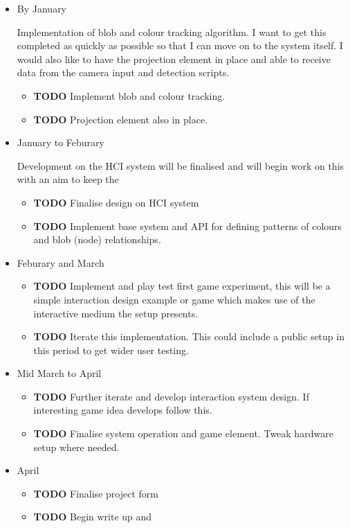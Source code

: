 \documentclass[11pt]{article}
\begin{document}
\begin{itemize}
\item By January
\label{sec:orgc368095}

Implementation of blob and colour tracking algorithm. I want to get this completed as quickly as possible so that I can move on to the system itself. I would also like to have the projection element in place and able to receive data from the camera input and detection scripts.\\
\begin{itemize}
\item {\bfseries\sffamily TODO} Implement blob and colour tracking.
\label{sec:orga0b261e}
\item {\bfseries\sffamily TODO} Projection element also in place.
\label{sec:org0037926}
\end{itemize}
\item January to Feburary
\label{sec:orge041dfd}

Development on the HCI system will be finalised and will begin work on this with an aim to keep the\\
\begin{itemize}
\item {\bfseries\sffamily TODO} Finalise design on HCI system
\label{sec:org12a0f30}
\item {\bfseries\sffamily TODO} Implement base system and API for defining patterns of colours and blob (node) relationships.
\label{sec:org5c20517}
\end{itemize}
\item Feburary and March
\label{sec:orgf25e615}
\begin{itemize}
\item {\bfseries\sffamily TODO} Implement and play test first game experiment, this will be a simple interaction design example or game which makes use of the interactive medium the setup presents.
\label{sec:org3f88d1a}
\item {\bfseries\sffamily TODO} Iterate this implementation. This could include a public setup in this period to get wider user testing.
\label{sec:orgf48ce48}
\end{itemize}
\item Mid March to April
\label{sec:orgaf6070c}
\begin{itemize}
\item {\bfseries\sffamily TODO} Further iterate and develop interaction system design. If interesting game idea develops follow this.
\label{sec:org7da106b}
\item {\bfseries\sffamily TODO} Finalise system operation and game element. Tweak hardware setup where needed.
\label{sec:orgbabd798}
\end{itemize}
\item April
\label{sec:org40219a5}
\begin{itemize}
\item {\bfseries\sffamily TODO} Finalise project form
\label{sec:org74d7da8}
\item {\bfseries\sffamily TODO} Begin write up and
\label{sec:org7f8fdd8}
\end{itemize}
\end{itemize}
\end{document}
